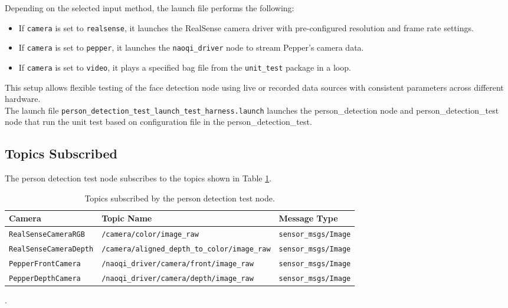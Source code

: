 \documentclass{CSSRforAfrica}
\begin{document}
Depending on the selected input method, the launch file performs the following:

\begin{itemize}
	\item If \texttt{camera} is set to \texttt{realsense}, it launches the RealSense camera driver with pre-configured resolution and frame rate settings.
	\item If \texttt{camera} is set to \texttt{pepper}, it launches the \texttt{naoqi\_driver} node to stream Pepper’s camera data.
	\item If \texttt{camera} is set to \texttt{video}, it plays a specified bag file from the \texttt{unit\_test} package in a loop.
\end{itemize}

This setup allows flexible testing of the face detection node using live or recorded data sources with consistent parameters across different hardware.\\

The launch file \texttt{person\_detection\_test\_launch\_test\_harness.launch} launches the person\_detection node and person\_detection\_test node that run the unit test based on configuration file in the person\_detection\_test.

\newpage

\subsection*{Topics Subscribed}
The person detection test node subscribes to the  topics shown in Table \ref{tab:topics}.

\begin{table}[!h]
	\centering
	{\fontsize{9.0}{12.0}\selectfont %
		\begin{tabularx}{\linewidth}{| l | l | X |}
			\hline
			\rowcolor{blue!20}
			\textbf{Camera} & \textbf{Topic Name} & \textbf{Message Type} \\
			\hline
			\texttt{RealSenseCameraRGB} & \texttt{/camera/color/image\_raw} & \texttt{sensor\_msgs/Image} \\
			\hline
			\texttt{RealSenseCameraDepth} & \texttt{/camera/aligned\_depth\_to\_color/image\_raw} & \texttt{sensor\_msgs/Image} \\
			\hline
			\texttt{PepperFrontCamera} & \texttt{/naoqi\_driver/camera/front/image\_raw} & \texttt{sensor\_msgs/Image} \\
			\hline
			\texttt{PepperDepthCamera} & \texttt{/naoqi\_driver/camera/depth/image\_raw} & \texttt{sensor\_msgs/Image} \\
			\hline
		\end{tabularx}
	}
	\caption{Topics subscribed by the person detection test node.}
\label{tab:topics}.
\end{table}
\end{document}
